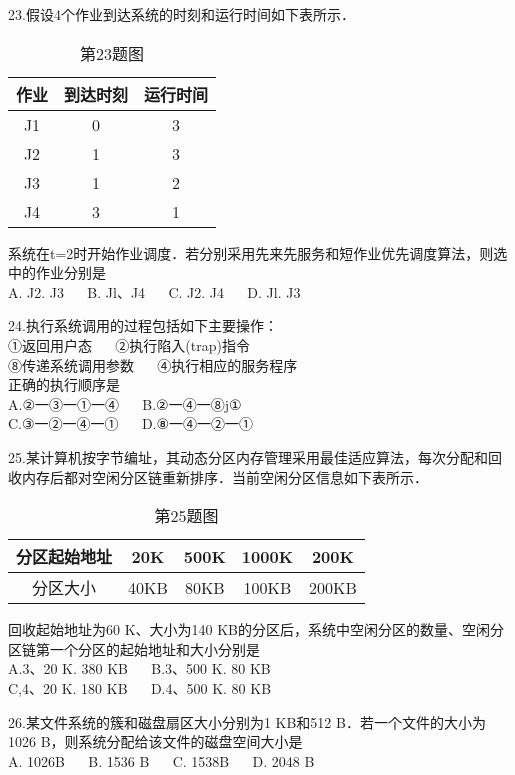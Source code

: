 23.假设4个作业到达系统的时刻和运行时间如下表所示．
\begin{table}[ht]
\centering
\caption{第23题图}\label{CSN17_tab1}
\begin{tabular}{|c|c|c|}
\hline
作业 & 到达时刻 & 运行时间 \\
\hline
J1 & 0 & 3 \\
\hline
J2 & 1 & 3 \\
\hline
J3 & 1 & 2 \\
\hline
J4 & 3 & 1 \\
\hline
\end{tabular}
\end{table}
系统在t=2时开始作业调度．若分别采用先来先服务和短作业优先调度算法，则选中的作业分别是 \\
A. J2. J3  $\quad$  B. Jl、J4  $\quad$  C. J2. J4  $\quad$  D. Jl. J3

24.执行系统调用的过程包括如下主要操作： \\
①返回用户态  $\quad$  ②执行陷入(trap)指令 \\
⑧传递系统调用参数  $\quad$ ④执行相应的服务程序 \\
正确的执行顺序是 \\
A.②一③一①一④ $\quad$ B.②一④一⑧j① \\
C.③一②一④一① $\quad$ D.⑧一④一②一①

25.某计算机按字节编址，其动态分区内存管理采用最佳适应算法，每次分配和回收内存后都对空闲分区链重新排序．当前空闲分区信息如下表所示． \\
\begin{table}[ht]
\centering
\caption{第25题图}\label{CSN17_tab2}
\begin{tabular}{|c|c|c|c|c|}
\hline
分区起始地址 & 20K & 500K & 1000K & 200K \\
\hline
分区大小 & 40KB & 80KB & 100KB & 200KB \\
\hline
\end{tabular}
\end{table}
回收起始地址为60 K、大小为140 KB的分区后，系统中空闲分区的数量、空闲分区链第一个分区的起始地址和大小分别是 \\
A.3、20 K. 380 KB  $\quad$  B.3、500 K.  80 KB \\
C,4、20 K.  180 KB  $\quad$  D.4、500 K.  80 KB

26.某文件系统的簇和磁盘扇区大小分别为1 KB和512 B．若一个文件的大小为1026 B，则系统分配给该文件的磁盘空间大小是 \\
A. 1026B  $\quad$  B.  1536 B  $\quad$  C. 1538B  $\quad$  D.  2048 B

